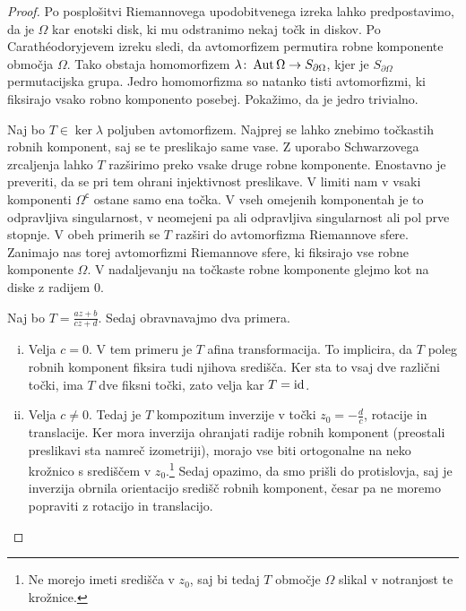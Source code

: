 \begin{proof}
Po posplošitvi Riemannovega upodobitvenega izreka lahko
predpostavimo, da je $\Omega$ kar enotski disk, ki mu odstranimo
nekaj točk in diskov. Po Carathéodoryjevem izreku
\cite[izrek~5.1.1 in opomba~5.1.2]{krantz} sledi, da avtomorfizem
permutira robne komponente območja $\Omega$. Tako obstaja
homomorfizem $\lambda \colon \operatorname{Aut} \Omega \to S_{\partial \Omega}$,
kjer je $S_{\partial{\Omega}}$ permutacijska grupa. Jedro
homomorfizma so natanko tisti avtomorfizmi, ki fiksirajo vsako
robno komponento posebej. Pokažimo, da je jedro trivialno.

Naj bo $T \in \ker \lambda$ poljuben avtomorfizem. Najprej se lahko
znebimo točkastih robnih komponent, saj se te preslikajo same vase.
Z uporabo Schwarzovega zrcaljenja lahko $T$ razširimo preko vsake
druge robne komponente. Enostavno je preveriti, da se pri tem
ohrani injektivnost preslikave. V limiti nam v vsaki komponenti
$\Omega^\mathsf{c}$ ostane samo ena točka. V vseh omejenih
komponentah je to odpravljiva singularnost, v neomejeni pa ali
odpravljiva singularnost ali pol prve stopnje. V obeh primerih se
$T$ razširi do avtomorfizma Riemannove sfere. Zanimajo nas torej
avtomorfizmi Riemannove sfere, ki fiksirajo vse robne komponente
$\Omega$. V nadaljevanju na točkaste robne komponente glejmo kot na
diske z radijem $0$.

Naj bo $T = \frac{az + b}{cz + d}$. Sedaj obravnavajmo dva primera.

\begin{enumerate}[i)]
\item Velja $c=0$. V tem primeru je $T$ afina transformacija. To
implicira, da $T$ poleg robnih komponent fiksira tudi njihova
središča. Ker sta to vsaj dve različni točki, ima $T$ dve fiksni
točki, zato velja kar $T = \operatorname{id}$.

\item Velja $c \ne 0$. Tedaj je $T$ kompozitum inverzije v točki
$z_0 = -\frac{d}{c}$, rotacije in translacije. Ker mora inverzija
ohranjati radije robnih komponent (preostali preslikavi sta namreč
izometriji), morajo vse biti ortogonalne na neko krožnico s
središčem v $z_0$.\footnote{Ne morejo imeti središča v $z_0$, saj
bi tedaj $T$ območje $\Omega$ slikal v notranjost te krožnice.}
Sedaj opazimo, da smo prišli do protislovja, saj je inverzija
obrnila orientacijo središč robnih komponent, česar pa ne moremo
popraviti z rotacijo in translacijo.
\end{enumerate}




\end{proof}
